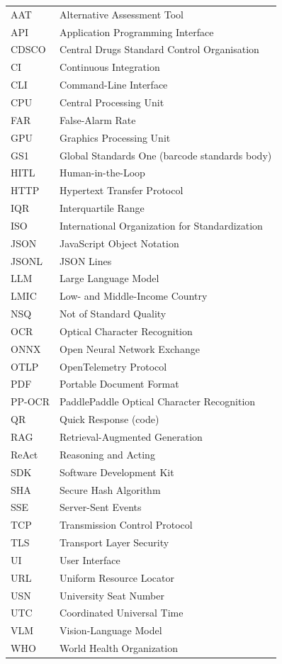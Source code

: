 \renewcommand{\arraystretch}{0.86}
\begin{longtable}{@{}p{2.8cm}l@{}}
AAT & Alternative Assessment Tool \\
API & Application Programming Interface \\
CDSCO & Central Drugs Standard Control Organisation \\
CI & Continuous Integration \\
CLI & Command-Line Interface \\
CPU & Central Processing Unit \\
FAR & False-Alarm Rate \\
GPU & Graphics Processing Unit \\
GS1 & Global Standards One (barcode standards body) \\
HITL & Human-in-the-Loop \\
HTTP & Hypertext Transfer Protocol \\
IQR & Interquartile Range \\
ISO & International Organization for Standardization \\
JSON & JavaScript Object Notation \\
JSONL & JSON Lines \\
LLM & Large Language Model \\
LMIC & Low- and Middle-Income Country \\
NSQ & Not of Standard Quality \\
OCR & Optical Character Recognition \\
ONNX & Open Neural Network Exchange \\
OTLP & OpenTelemetry Protocol \\
PDF & Portable Document Format \\
PP-OCR & PaddlePaddle Optical Character Recognition \\
QR & Quick Response (code) \\
RAG & Retrieval-Augmented Generation \\
ReAct & Reasoning and Acting \\
SDK & Software Development Kit \\
SHA & Secure Hash Algorithm \\
SSE & Server-Sent Events \\
TCP & Transmission Control Protocol \\
TLS & Transport Layer Security \\
UI & User Interface \\
URL & Uniform Resource Locator \\
USN & University Seat Number \\
UTC & Coordinated Universal Time \\
VLM & Vision-Language Model \\
WHO & World Health Organization \\
\end{longtable}
